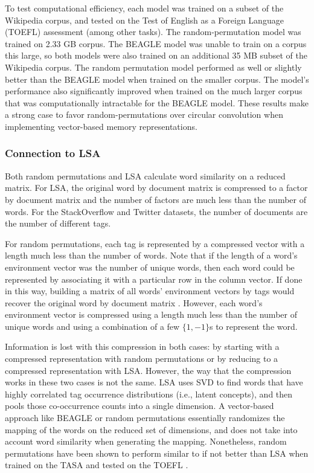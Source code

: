 \documentclass[man,floatsintext,donotrepeattitle]{apa6}
\begin{document}
To test computational efficiency, each model was trained on a subset of the Wikipedia corpus, and tested on the Test of English as a Foreign Language (TOEFL) assessment (among other tasks).
The random-permutation model was trained on \num{2.33} GB corpus.
The BEAGLE model was unable to train on a corpus this large, so both models were also trained on an additional \num{35} MB subset of the Wikipedia corpus.
The random permutation model performed as well or slightly better than the BEAGLE model when trained on the smaller corpus.
The model's performance also significantly improved when trained on the much larger corpus that was computationally intractable for the BEAGLE model.
These results make a strong case to favor random-permutations over circular convolution when implementing vector-based memory representations.

\subsubsection{Connection to LSA}

Both random permutations and LSA calculate word similarity on a reduced matrix.
For LSA, the original word by document matrix is compressed to a factor by document matrix and the number of factors are much less than the number of words.
For the StackOverflow and Twitter datasets, the number of documents are the number of different tags.

For random permutations, each tag is represented by a compressed vector with a length much less than the number of words.
Note that if the length of a word's environment vector was the number of unique words, then each word could be represented by associating it with a particular row in the column vector.
If done in this way, building a matrix of all words' environment vectors by tags would recover the original word by document matrix \parencite{Kanerva2000}.
However, each word's environment vector is compressed using a length much less than the number of unique words and using a combination of a few $\{1,-1\}$s to represent the word.

Information is lost with this compression in both cases: by starting with a compressed representation with random permutations or by reducing to a compressed representation with LSA.
However, the way that the compression works in these two cases is not the same.
LSA uses SVD to find words that have highly correlated tag occurrence distributions (i.e., latent concepts), and then pools those co-occurrence counts into a single dimension.
A vector-based approach like BEAGLE or random permutations essentially randomizes the mapping of the words on the reduced set of dimensions, and does not take into account word similarity when generating the mapping.
Nonetheless, random permutations have been shown to perform similar to if not better than LSA when trained on the TASA and tested on the TOEFL \parencites{Sahlgren2008,Jones2007}.
\end{document}
